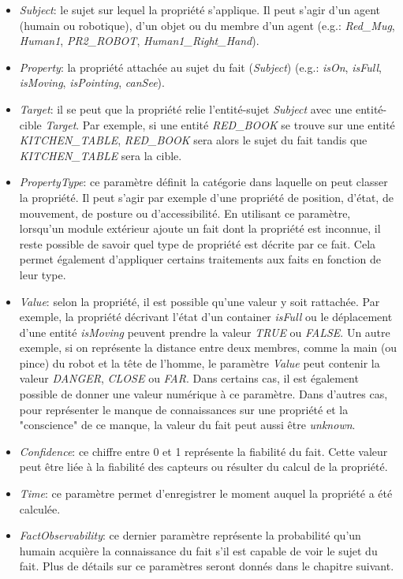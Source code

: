 \documentclass[a4paper,11pt,twoside]{StyleThese}
\begin{document}
\begin{itemize}
\item \textit{Subject}: le sujet sur lequel la propriété s'applique. Il peut s'agir d'un agent (humain ou robotique), d'un objet ou du membre d'un agent (e.g.: \textit{Red\_Mug}, \textit{Human1}, \textit{PR2\_ROBOT}, \textit{Human1\_Right\_Hand}).
\item \textit{Property}: la propriété attachée au sujet du fait (\textit{Subject}) (e.g.: \textit{isOn}, \textit{isFull}, \textit{isMoving}, \textit{isPointing}, \textit{canSee}).
\item \textit{Target}: il se peut que la propriété relie l'entité-sujet \textit{Subject} avec une entité-cible \textit{Target}. Par exemple, si une entité \textit{RED\_BOOK} se trouve sur une entité \textit{KITCHEN\_TABLE}, \textit{RED\_BOOK} sera alors le sujet du fait tandis que \textit{KITCHEN\_TABLE} sera la cible.
\item \textit{PropertyType}: ce paramètre définit la catégorie dans laquelle on peut classer la propriété. Il peut s'agir par exemple d'une propriété de position, d'état, de mouvement, de posture ou d'accessibilité. En utilisant ce paramètre, lorsqu'un module extérieur ajoute un fait dont la propriété est inconnue, il reste possible de savoir quel type de propriété est décrite par ce fait. Cela permet également d'appliquer certains traitements aux faits en fonction de leur type.
\item \textit{Value}: selon la propriété, il est possible qu'une valeur y soit rattachée. Par exemple, la propriété décrivant l'état d'un container \textit{isFull} ou le déplacement d'une entité \textit{isMoving} peuvent prendre la valeur \textit{TRUE} ou \textit{FALSE}. Un autre exemple, si on représente la distance entre deux membres, comme la main (ou pince) du robot et la tête de l'homme, le paramètre \textit{Value} peut contenir la valeur \textit{DANGER}, \textit{CLOSE} ou \textit{FAR}. Dans certains cas, il est également possible de donner une valeur numérique à ce paramètre.
Dans d'autres cas, pour représenter le manque de connaissances sur une propriété et la "conscience" de ce manque, la valeur du fait peut aussi être \textit{unknown}.
\item \textit{Confidence}: ce chiffre entre 0 et 1 représente la fiabilité du fait. Cette valeur peut être liée à la fiabilité des capteurs ou résulter du calcul de la propriété.
\item \textit{Time}: ce paramètre permet d'enregistrer le moment auquel la propriété a été calculée.
\item \textit{FactObservability}: ce dernier paramètre représente la probabilité qu'un humain acquière la connaissance du fait s'il est capable de voir le sujet du fait. Plus de détails sur ce paramètres seront donnés dans le chapitre suivant.
\end{itemize}
\end{document}
